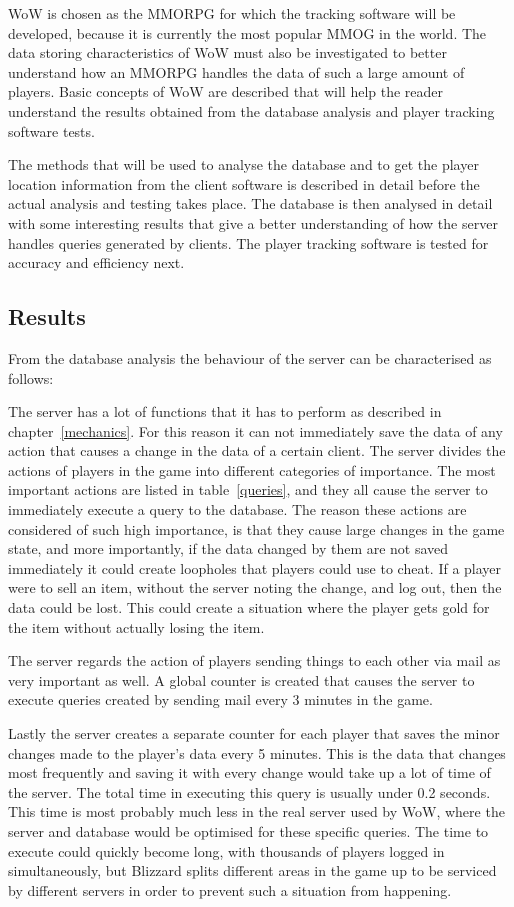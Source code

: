 WoW is chosen as the MMORPG for which the tracking software will be developed, because it is currently the most popular MMOG in the world. The data storing characteristics of WoW must also be investigated to better understand how an MMORPG handles the data of such a large amount of players. Basic concepts of WoW are described that will help the reader understand the results obtained from the database analysis and player tracking software tests.

The methods that will be used to analyse the database and to get the player location information from the client software is described in detail before the actual analysis and testing takes place. The database is then analysed in detail with some interesting results that give a better understanding of how the server handles queries generated by clients. The player tracking software is tested for accuracy and efficiency next.

\subsection{Results}

From the database analysis the behaviour of the server can be characterised as follows:

The server has a lot of functions that it has to perform as described in chapter~\ref{mechanics}. For this reason it can not immediately save the data of any action that causes a change in the data of a certain client. The server divides the actions of players in the game into different categories of importance. The most important actions are listed in table~\ref{queries}, and they all cause the server to immediately execute a query to the database. The reason these actions are considered of such high importance, is that they cause large changes in the game state, and more importantly, if the data changed by them are not saved immediately it could create loopholes that players could use to cheat. If a player were to sell an item, without the server noting the change, and log out, then the data could be lost. This could create a situation where the player gets gold for the item without actually losing the item.

The server regards the action of players sending things to each other via mail as very important as well. A global counter is created that causes the server to execute queries created by sending mail every 3 minutes in the game.

Lastly the server creates a separate counter for each player that saves the minor changes made to the player's data every 5 minutes. This is the data that changes most frequently and saving it with every change would take up a lot of time of the server. The total time in executing this query is usually under 0.2 seconds. This time is most probably much less in the real server used by WoW, where the server and database would be optimised for these specific queries. The time to execute could quickly become long, with thousands of players logged in simultaneously, but Blizzard splits different areas in the game up to be serviced by different servers in order to prevent such a situation from happening. 

